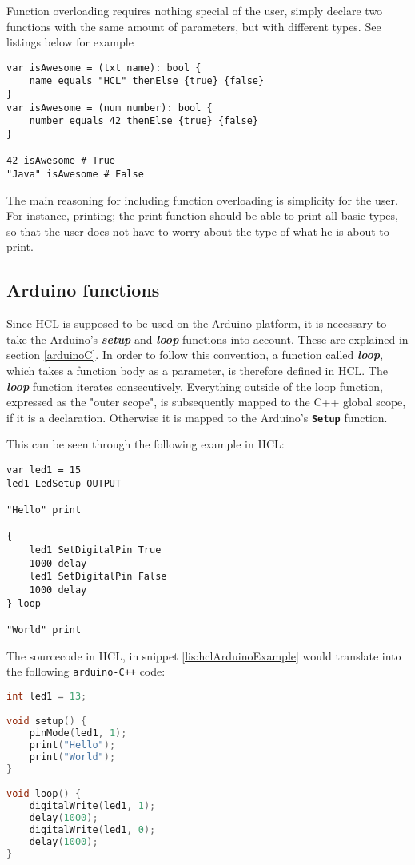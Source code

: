 Function overloading requires nothing special of the user, simply declare two functions with the same amount of parameters, but with different types. 
See listings below for example

\begin{lstlisting}[language=HCL,label=lis:hclEqualsThenElse,firstnumber=1]
var isAwesome = (txt name): bool {
	name equals "HCL" thenElse {true} {false}
}
var isAwesome = (num number): bool {
	number equals 42 thenElse {true} {false}
}

42 isAwesome # True
"Java" isAwesome # False
\end{lstlisting}

The main reasoning for including function overloading is simplicity for the user.
For instance, printing; the print function should be able to print all basic types, so that the user does not have to worry about the type of what he is about to print.

\subsection{Arduino functions}
Since HCL is supposed to be used on the Arduino platform, it is necessary to take the Arduino's \textbf{\textit{setup}} and \textbf{\textit{loop}} functions into account. 
These are explained in section \ref{arduinoC}.
In order to follow this convention, a function called \textbf{\textit{loop}}, which takes a function body as a parameter, is therefore defined in HCL.
The \textbf{\textit{loop}} function iterates consecutively.
Everything outside of the loop function, expressed as the "outer scope", is subsequently mapped to the C++ global scope, if it is a declaration.
Otherwise it is mapped to the Arduino's \textbf{\texttt{Setup}} function.

This can be seen through the following example in HCL:
\begin{lstlisting}[language=HCL,caption={Example of an arduino program in HCL},label={lis:hclArduinoExample},firstnumber=1]
var led1 = 15 
led1 LedSetup OUTPUT 

"Hello" print

{
	led1 SetDigitalPin True
	1000 delay
	led1 SetDigitalPin False
	1000 delay
} loop

"World" print 
\end{lstlisting}
The sourcecode in HCL, in snippet \ref{lis:hclArduinoExample} would translate into the following \texttt{arduino-C++} code:
\begin{lstlisting}[language=C,label={lis:cppArduinoExample},firstnumber=1]
int led1 = 13;

void setup() {
	pinMode(led1, 1);
	print("Hello");
	print("World");
}

void loop() {
	digitalWrite(led1, 1);
	delay(1000);
	digitalWrite(led1, 0);
	delay(1000);
} 
\end{lstlisting}


